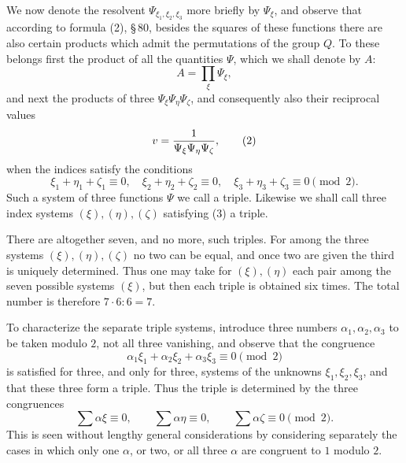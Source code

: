 \documentclass[11pt]{article}
\begin{document}
We now denote the resolvent $\Psi_{\xi_1,\xi_2,\xi_3}$ more briefly by $\Psi_\xi$, and observe that according to formula (2), \S\,80, besides the squares of these functions there are also certain products which admit the permutations of the group $Q$. To these belongs first the product of all the quantities $\Psi$, which we shall denote by $A$:
\begin{equation}
 A=\prod_\xi \Psi_\xi,
 \tag{1}
\end{equation}
and next the products of three $\Psi_\xi\Psi_\eta\Psi_\zeta$, and consequently also their reciprocal values
\begin{equation}
 v={1\over \Psi_\xi\Psi_\eta\Psi_\zeta},
 \tag{2}
\end{equation}
when the indices satisfy the conditions
\begin{equation}
 \xi_1+\eta_1+\zeta_1\equiv0,
 \quad \xi_2+\eta_2+\zeta_2\equiv0,
 \quad \xi_3+\eta_3+\zeta_3\equiv0\pmod2.
 \tag{3}
\end{equation}
Such a system of three functions $\Psi$ we call a triple. Likewise we shall call three index systems $(\xi),(\eta),(\zeta)$ satisfying (3) a triple.

There are altogether seven, and no more, such triples. For among the three systems $(\xi),(\eta),(\zeta)$ no two can be equal, and once two are given the third is uniquely determined. Thus one may take for $(\xi),(\eta)$ each pair among the seven possible systems $(\xi)$, but then each triple is obtained six times. The total number is therefore $7\cdot6:6=7$.

To characterize the separate triple systems, introduce three numbers $\alpha_1,\alpha_2,\alpha_3$ to be taken modulo $2$, not all three vanishing, and observe that the congruence
\begin{equation}
 \alpha_1\xi_1+\alpha_2\xi_2+\alpha_3\xi_3\equiv0\pmod2
 \tag{4}
\end{equation}
is satisfied for three, and only for three, systems of the unknowns $\xi_1,\xi_2,\xi_3$, and that these three form a triple. Thus the triple is determined by the three congruences
\begin{equation}
 \sum\alpha\xi\equiv0,
 \qquad \sum\alpha\eta\equiv0,
 \qquad \sum\alpha\zeta\equiv0\pmod2.
 \tag{5}
\end{equation}
This is seen without lengthy general considerations by considering separately the cases in which only one $\alpha$, or two, or all three $\alpha$ are congruent to $1$ modulo $2$.
\end{document}
